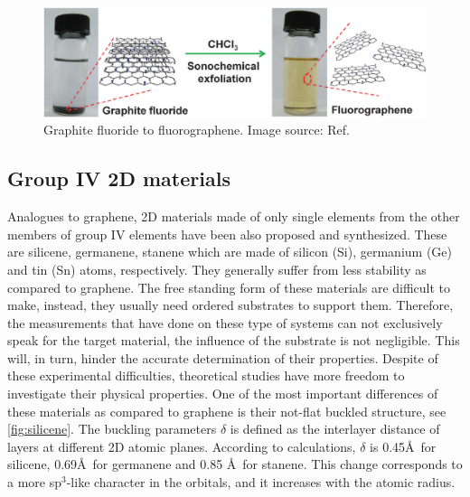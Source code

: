 \begin{figure}[htbp!] 
\centering  
\includegraphics[width=1\textwidth]{fluorographene.png}
\caption[Graphite fluoride to fluorographene]{Graphite fluoride to fluorographene. Image source: Ref. \cite{Zhu2013}}  
\label{fig:gra_f}
\end{figure} 

\subsection{Group IV 2D materials}

Analogues to graphene, 2D materials made of only single elements from the other members of group IV elements have been also proposed and synthesized. These are silicene, germanene, stanene which are made of silicon (Si), germanium (Ge) and tin (Sn) atoms, respectively. They generally suffer from less stability as compared to graphene. The free standing form of these materials are difficult to make, instead, they usually need ordered substrates to support them. Therefore, the measurements that have done on these type of systems can not exclusively speak for the target material, the influence of the substrate is not negligible\cite{Lin2013}. This will, in turn, hinder the accurate determination of their properties. Despite of these experimental difficulties, theoretical studies have more freedom to investigate their physical properties. One of the most important differences of these materials as compared to graphene is their not-flat buckled structure, see \autoref{fig:silicene}. The buckling parameters $\delta$ is defined as the interlayer distance of layers at different 2D atomic planes. According to calculations, $\delta$ is 0.45\AA~for silicene, 0.69\AA~for germanene and 0.85 \AA~for stanene\cite{matthes2013}. This change corresponds to a more sp$^3$-like character in the orbitals, and it increases with the atomic radius. 


